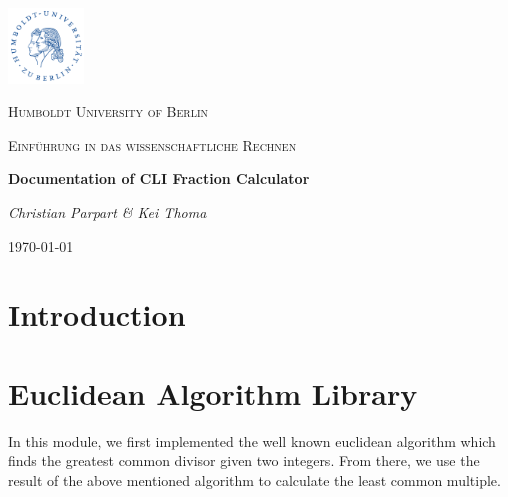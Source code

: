 \documentclass[refman]{scrartcl}
\begin{document}

\begin{titlepage}
	\centering
	\includegraphics[width=0.15\textwidth]{huberlin_logo}\par\vspace{1cm}
	{\scshape\LARGE Humboldt University of Berlin \par}
	\vspace{1cm}
	{\scshape\Large Einf{\"u}hrung in das wissenschaftliche Rechnen \par}
	\vspace{1.5cm}
	{\huge\bfseries Documentation of CLI Fraction Calculator\par}
	\vspace{2cm}
	{\Large\itshape Christian Parpart \& Kei Thoma \par}

	\vfill

	{\large \today\par}
\end{titlepage}

\tableofcontents
\newpage


\section{Introduction}

\section{Euclidean Algorithm Library}

In this module, we first implemented the well known euclidean algorithm which finds the greatest common divisor given two integers. From there, we use the result of the above mentioned algorithm to calculate the least common multiple.
\end{document}
